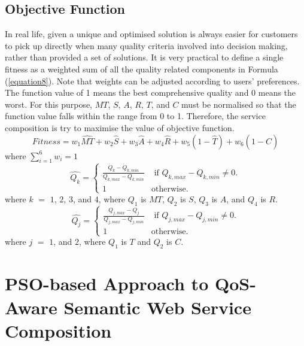\documentclass{IEEEtran}
\begin{document}
\subsection{Objective Function}
In real life, given a unique and optimised solution is always easier for customers to pick up directly when many quality criteria involved into decision making, rather than provided a set of solutions. It is very practical to define a single fitness as a weighted sum of all the quality related components in Formula (\ref{equation8}). Note that weights can be adjusted according to users' preferences. The function value of 1 means the best comprehensive quality and 0 means the worst. For this purpose, $MT$, $S$, $A$, $R$, $T$, and $C$ must be normalised so that the function value falls within the range from 0 to 1. Therefore, the service composition is try to maximise the value of objective function.
\vspace{-0.2cm}
\begin{equation}
\label{equation8}
Fitness = w_1 \hat{MT} + w_2 \hat{S} + w_3 \hat{A} + w_4 \hat{R} + w_5(1 - \hat{T}) + w_6(1 - \hat{C})
\end{equation}
\noindent where $\sum_{i=1}^{6} w_i = 1$
\\
\vspace{-0.2cm}
\begin{equation}
\label{equation9}
\hat{Q_k} = 
\begin{cases}
	\frac{Q_k - Q_{k, min}}{Q_{k, max} - Q_{k, min}} & \text{ if }Q_{k, max} - Q_{k, min} \neq 0.\\
	1 & \mathrm{ otherwise}.
\end{cases}
\end{equation}
\noindent where $k$ $=$ $1$, $2$, $3$, and $4$, where $Q_1$ is $MT$, $Q_2$ is $S$, $Q_3$ is $A$, and $Q_4$ is $R$.
\begin{equation}
\label{equation10}
\hat{Q_j} = 
\begin{cases}
	\frac{Q_{j,max} - Q_j}{Q_{j, max} - Q_{j, min}} & \text{ if }Q_{j, max} - Q_{j, min} \neq 0.\\
	1 & \mathrm{ otherwise}.
\end{cases}
\end{equation}
\noindent where $j$ $=$ $1$, and $2$, where $Q_1$ is $T$ and $Q_2$ is $C$.


\section{PSO-based Approach to QoS-Aware Semantic Web Service Composition}\label{qswsc_approach}
\end{document}
